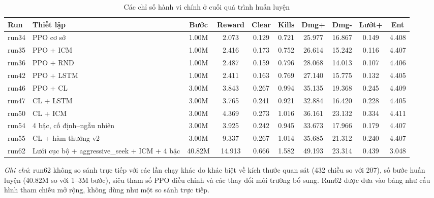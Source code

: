 \begin{table}[H]
    \centering
    \scriptsize
    \setlength{\tabcolsep}{4pt}
    \renewcommand{\arraystretch}{1.15}
    \caption{Các chỉ số hành vi chính ở cuối quá trình huấn luyện}
    \label{tab:run_metrics_main}
    \begin{tabular}{l p{3.0cm} c c c c c c c c}
        \toprule
        \textbf{Run} & \textbf{Thiết lập} & \textbf{Bước} & \textbf{Reward} & \textbf{Clear} & \textbf{Kills} & \textbf{Dmg+} & \textbf{Dmg-} & \textbf{Lướt+} & \textbf{Ent} \\
        \midrule
        run34 & PPO cơ sở & 1.00M & 2.073 & 0.129 & 0.721 & 25.977 & 16.867 & 0.149 & 4.408 \\
        run35 & PPO + ICM & 1.00M & 2.416 & 0.173 & 0.752 & 26.614 & 15.242 & 0.116 & 4.407 \\
        run36 & PPO + RND & 1.00M & 2.487 & 0.159 & 0.796 & 28.068 & 14.013 & 0.107 & 4.406 \\
        run42 & PPO + LSTM & 1.00M & 2.411 & 0.163 & 0.769 & 27.140 & 15.775 & 0.132 & 4.405 \\
        run46 & PPO + CL & 3.00M & 3.843 & 0.267 & 0.994 & 35.135 & 19.368 & 0.245 & 4.409 \\
        run47 & CL + LSTM & 3.00M & 3.765 & 0.241 & 0.921 & 32.884 & 16.420 & 0.228 & 4.405 \\
        run50 & CL + ICM & 3.00M & 4.369 & 0.273 & 1.016 & 36.161 & 23.132 & 0.334 & 4.411 \\
        run54 & 4 bậc, cố định--ngẫu nhiên & 3.00M & 3.925 & 0.242 & 0.945 & 33.673 & 17.966 & 0.179 & 4.407 \\
        run55 & CL + hàm thưởng v2 & 3.00M & 9.337 & 0.267 & 1.014 & 35.685 & 21.312 & 0.240 & 4.407 \\
        run62 & Lưới cục bộ + aggressive\_seek + ICM + 4 bậc & 40.82M & 14.913 & 0.666 & 1.582 & 49.193 & 23.314 & 0.439 & 3.048 \\
        \bottomrule
    \end{tabular}
    \vspace{10pt}
    
    \begin{minipage}{0.96\textwidth}
        \small\textit{Ghi chú}: run62 không so sánh trực tiếp với các lần chạy khác do khác biệt về kích thước quan sát (432 chiều so với 207), số bước huấn luyện (40.82M so với 1--3M bước), siêu tham số PPO điều chỉnh và các thay đổi môi trường bổ sung. Run62 được đưa vào bảng như cấu hình tham chiếu mở rộng, không dùng như một so sánh trực tiếp.
    \end{minipage}
\end{table}


